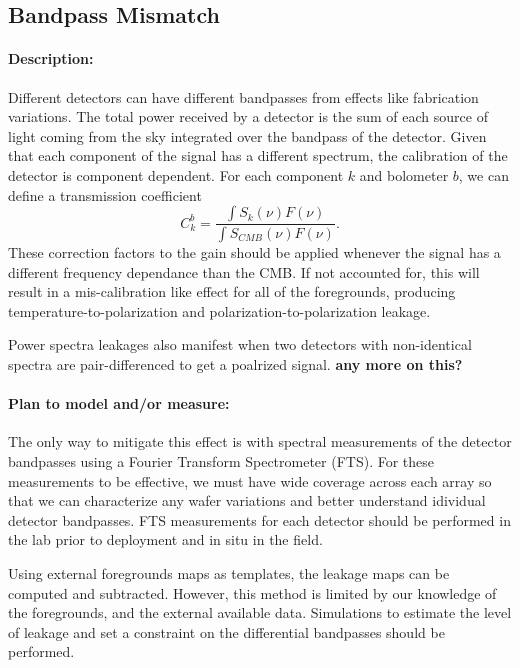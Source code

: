 \subsection{Bandpass Mismatch}

\paragraph{Description:}
Different detectors can have different bandpasses from effects like fabrication variations. The total power received by a detector is the sum of each source of light coming from the sky integrated over the bandpass of the detector. Given that each component of the signal has a different spectrum, the calibration of the detector is component dependent. For each component $k$ and bolometer $b$, we can define a transmission coefficient
\begin{equation}
C_k^b = \frac{\int S_k(\nu) F(\nu)}{\int S_{CMB}(\nu) F(\nu)}.
\end{equation}
These correction factors to the gain should be applied whenever the signal has a different frequency dependance than the CMB.
If not accounted for, this will result in a mis-calibration like effect for all of the foregrounds, producing temperature-to-polarization and polarization-to-polarization leakage.

Power spectra leakages also manifest when two detectors with non-identical spectra are pair-differenced to get a poalrized signal. \textbf{any more on this?}

\paragraph{Plan to model and/or measure:}
The only way to mitigate this effect is with spectral measurements of the detector bandpasses using a Fourier Transform Spectrometer (FTS). For these measurements to be effective, we must have wide coverage across each array so that we can characterize any wafer variations and better understand idividual detector bandpasses. FTS measurements for each detector should be performed in the lab prior to deployment and in situ in the field.

Using external foregrounds maps as templates, the leakage maps can be computed and subtracted. However, this method is limited by our knowledge of the foregrounds, and the external available data. Simulations to estimate the level of leakage and set a constraint on the differential bandpasses should be performed.

